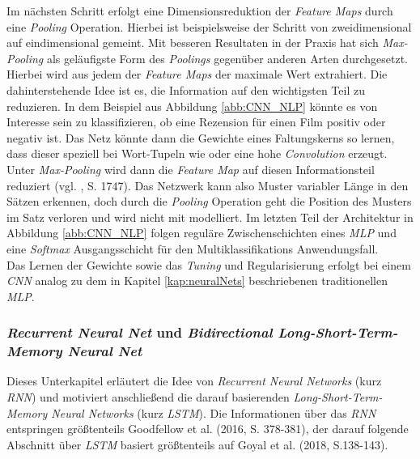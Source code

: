\documentclass[a4paper,11pt]{article}
\begin{document}
Im nächsten Schritt erfolgt eine Dimensionsreduktion der \textit{Feature Maps} durch eine \textit{Pooling} Operation. Hierbei ist beispielsweise der Schritt von zweidimensional auf eindimensional gemeint. Mit besseren Resultaten in der Praxis hat sich \textit{Max-Pooling} als geläufigste Form des \textit{Poolings} gegenüber anderen Arten durchgesetzt. Hierbei wird aus jedem der \textit{Feature Maps} der maximale Wert extrahiert. Die dahinterstehende Idee ist es, die Information auf den wichtigsten Teil zu reduzieren. In dem Beispiel aus Abbildung \ref{abb:CNN_NLP} könnte es von Interesse sein zu klassifizieren, ob eine Rezension für einen Film positiv oder negativ ist. Das Netz könnte dann die Gewichte eines Faltungskerns so lernen, dass dieser speziell bei Wort-Tupeln wie  oder  eine hohe \textit{Convolution} erzeugt. Unter \textit{Max-Pooling} wird dann die \textit{Feature Map} auf diesen Informationsteil reduziert (vgl. \cite{cnnSentence}, S. 1747). Das Netzwerk kann also Muster variabler Länge in den Sätzen erkennen, doch durch die \textit{Pooling} Operation geht die Position des Musters im Satz verloren und wird nicht mit modelliert.
Im letzten Teil der Architektur in Abbildung \ref{abb:CNN_NLP} folgen reguläre Zwischenschichten eines \textit{MLP} und eine \textit{Softmax} Ausgangsschicht für den Multiklassifikations Anwendungsfall.\\
Das Lernen der Gewichte sowie das \textit{Tuning} und Regularisierung erfolgt bei einem \textit{CNN} analog zu dem in Kapitel \ref{kap:neuralNets} beschriebenen traditionellen \textit{MLP}.

\subsubsection{\textit{Recurrent Neural Net} und \textit{Bidirectional Long-Short-Term-Memory Neural Net}} \label{kap:LSTM}

Dieses Unterkapitel erläutert die Idee von \textit{Recurrent Neural Networks} (kurz \textit{RNN}) und motiviert anschließend die darauf basierenden \textit{Long-Short-Term-Memory Neural Networks} (kurz \textit{LSTM}). Die Informationen über das \textit{RNN} entspringen größtenteils Goodfellow et al. (2016, S. 378-381), der darauf folgende Abschnitt über \textit{LSTM} basiert größtenteils auf Goyal et al. (2018, S.138-143).\\
\end{document}
